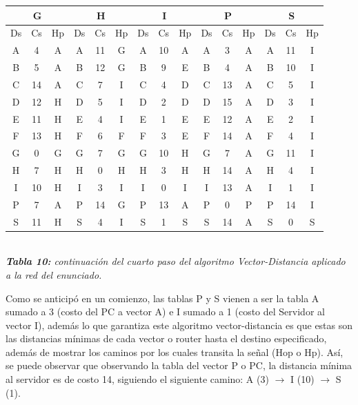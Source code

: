 \documentclass[letterpaper,10pt,onecolumn,titlepage]{article}
\begin{document}
  \begin{center}
   \begin{tabular}{|c|c|c|c|c|c|c|c|c|c|c|c|c|c|c|} \hline
     \multicolumn{3}{|c|}{G} & \multicolumn{3}{|c|}{H} &\multicolumn{3}{|c|}{I} & \multicolumn{3}{|c|}{P} & \multicolumn{3}{|c|}{S}    \\ \hline
     Ds & Cs & Hp & Ds & Cs & Hp & Ds & Cs & Hp & Ds & Cs & Hp & Ds & Cs & Hp  \\ \hline
     A  & 4  & A  & A  & 11  & G  & A  & 10  & A  & A  & 3  & A  & A  & 11  & I   \\ \hline
     B  & 5  & A  & B  & 12  & G  & B  & 9  & E  & B  & 4  & A  & B  & 10  & I   \\ \hline
     C  & 14  & A  & C  & 7  & I  & C  & 4  & D  & C  & 13  & A  & C  & 5  & I   \\ \hline
     D  & 12  & H  & D  & 5  & I  & D  & 2  & D  & D  & 15  & A  & D  & 3  & I   \\ \hline
     E  & 11  & H  & E  & 4  & I  & E  & 1  & E  & E  & 12  & A  & E  & 2  & I   \\ \hline
     F  & 13  & H  & F  & 6  & F  & F  & 3  & E  & F  & \color{red}14  &\color{red} A  & F  & 4  & I   \\ \hline
     G  & 0  & G  & G  & 7  & G  & G  & 10  & H  & G  & 7  & A  & G  & 11  & I   \\ \hline
     H  & 7  & H  & H  & 0  & H  & H  & 3  & H  & H  & 14  & A  & H  & 4  & I   \\ \hline
     I  & 10  & H  & I  & 3  & I  & I  & 0  & I  & I  & 13  & A  & I  & 1  & I   \\ \hline
     P  & 7  & A  & P  & 14  & G  & P  & 13  & A  & P  & 0  & P  & P  & 14  & I \\ \hline
     S  & 11  & H  & S  & 4  & I  & S  & 1  & S  & S  & 14  & A  & S  & 0  & S   \\ \hline
   \end{tabular}\\
   \textit{\textbf{Tabla 10:} continuación del cuarto paso del algoritmo Vector-Distancia aplicado a la red del enunciado.}
 \end{center}
 
Como se anticipó en un comienzo, las tablas P y S vienen a ser la tabla A sumado a 3 (costo del PC a vector A) e I sumado a 1 (costo del Servidor al vector I), además lo que garantiza este algoritmo vector-distancia es que estas son las distancias mínimas de cada vector o router hasta el destino especificado, además de mostrar los caminos por los cuales transita la señal (Hop o Hp). Así, se puede observar que observando la tabla del vector P o PC, la distancia mínima al servidor es de costo 14, siguiendo el siguiente camino: A (3) $\to$ I (10) $\to$ S (1).
\end{document}
